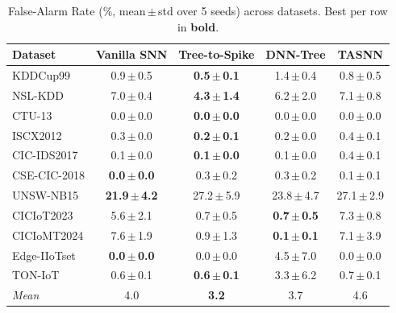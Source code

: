 \begin{table}[t]
\centering
\caption{False-Alarm Rate (\%, mean\,$\pm$\,std over 5 seeds) across datasets. Best per row in \textbf{bold}.}
\label{tab:FAR}
\footnotesize
\setlength{\tabcolsep}{4pt}
\begin{tabular}{lcccc}
\toprule
Dataset & Vanilla SNN & Tree-to-Spike & DNN-Tree & TASNN \\
\midrule
KDDCup99 & 0.9\,$\pm$\,0.5 & \textbf{0.5\,$\pm$\,0.1} & 1.4\,$\pm$\,0.4 & 0.8\,$\pm$\,0.5 \\
NSL-KDD & 7.0\,$\pm$\,0.4 & \textbf{4.3\,$\pm$\,1.4} & 6.2\,$\pm$\,2.0 & 7.1\,$\pm$\,0.8 \\
CTU-13 & 0.0\,$\pm$\,0.0 & \textbf{0.0\,$\pm$\,0.0} & 0.0\,$\pm$\,0.0 & 0.0\,$\pm$\,0.0 \\
ISCX2012 & 0.3\,$\pm$\,0.0 & \textbf{0.2\,$\pm$\,0.1} & 0.2\,$\pm$\,0.0 & 0.4\,$\pm$\,0.1 \\
CIC-IDS2017 & 0.1\,$\pm$\,0.0 & \textbf{0.1\,$\pm$\,0.0} & 0.1\,$\pm$\,0.0 & 0.4\,$\pm$\,0.1 \\
CSE-CIC-2018 & \textbf{0.0\,$\pm$\,0.0} & 0.3\,$\pm$\,0.2 & 0.3\,$\pm$\,0.2 & 0.1\,$\pm$\,0.1 \\
UNSW-NB15 & \textbf{21.9\,$\pm$\,4.2} & 27.2\,$\pm$\,5.9 & 23.8\,$\pm$\,4.7 & 27.1\,$\pm$\,2.9 \\
CICIoT2023 & 5.6\,$\pm$\,2.1 & 0.7\,$\pm$\,0.5 & \textbf{0.7\,$\pm$\,0.5} & 7.3\,$\pm$\,0.8 \\
CICIoMT2024 & 7.6\,$\pm$\,1.9 & 0.9\,$\pm$\,1.3 & \textbf{0.1\,$\pm$\,0.1} & 7.1\,$\pm$\,3.9 \\
Edge-IIoTset & \textbf{0.0\,$\pm$\,0.0} & 0.0\,$\pm$\,0.0 & 4.5\,$\pm$\,7.0 & 0.0\,$\pm$\,0.0 \\
TON-IoT & 0.6\,$\pm$\,0.1 & \textbf{0.6\,$\pm$\,0.1} & 3.3\,$\pm$\,6.2 & 0.7\,$\pm$\,0.1 \\
\midrule
\textit{Mean} & 4.0 & \textbf{3.2} & 3.7 & 4.6 \\
\bottomrule
\end{tabular}
\end{table}
